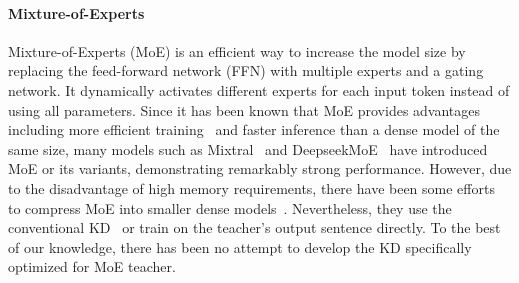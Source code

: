 \paragraph{Mixture-of-Experts}
Mixture-of-Experts (MoE) \citep{shazeer2017outrageously, lepikhin2020gshard, fedus2022switch} is an efficient way to increase the model size by replacing the feed-forward network (FFN) with multiple experts and a gating network.
It dynamically activates different experts for each input token instead of using all parameters.
Since it has been known that MoE provides advantages including more efficient training~\citep{he2022fastermoe, gale2023megablocks} and faster inference than a dense model of the same size, many models such as Mixtral~\citep{jiang2024mixtral} and DeepseekMoE~\citep{dai2024deepseekmoe} have introduced MoE or its variants, demonstrating remarkably strong performance.
However, due to the disadvantage of high memory requirements, there have been some efforts to compress MoE into smaller dense models~\citep{artetxe2021efficient, fedus2022switch, xue2022one, guo2025deepseek}.
Nevertheless, they use the conventional KD~\citep{sanh2019distilbert} or train on the teacher's output sentence directly. To the best of our knowledge, there has been no attempt to develop the KD specifically optimized for MoE teacher.